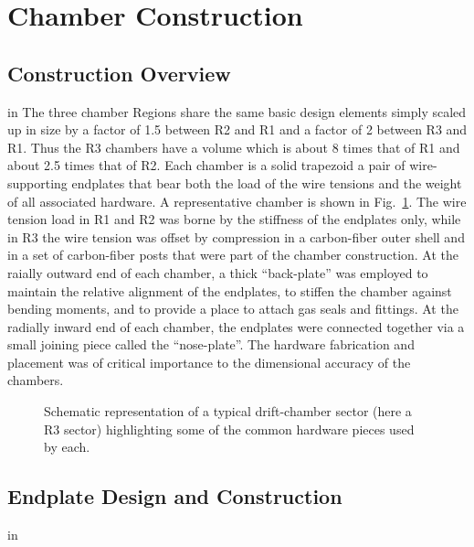 \section{Chamber Construction}

\subsection{Construction Overview}

 in
The three chamber Regions share the same basic design elements simply
scaled up in size by a factor of 1.5 between R2 and R1 and a factor
of 2 between R3 and R1.  Thus the R3 chambers have a volume which is
about 8 times that of R1 and about 2.5 times that of R2.  
Each chamber is a solid trapezoid 
a pair of wire-supporting endplates that bear both the load of the 
wire tensions and the weight of all associated hardware. A representative 
chamber is shown in Fig.~\ref{dcsector}.  The wire tension load in
R1 and R2 was borne by the stiffness of the endplates only, while in
R3 the wire tension was offset 
by compression in a carbon-fiber outer shell and in a set of carbon-fiber 
posts that were part of the chamber construction.  At the raially outward end of each chamber, a thick ``back-plate'' was employed to maintain the relative 
alignment of the endplates, to stiffen the chamber against bending moments, 
and to provide a place to attach gas seals and fittings. At the radially inward 
end of each chamber, the endplates were connected together via a small joining 
piece called the ``nose-plate''.  The hardware fabrication and placement 
was of critical importance to the dimensional accuracy of the chambers.

\begin{figure}[htpb]   
\vspace{4.5cm}
\caption{\small{Schematic representation of a typical drift-chamber sector 
(here a R3 sector) highlighting some of the common hardware pieces used by each.}}
\label{dcsector}
\end{figure}   

\subsection{Endplate Design and Construction}
 in

